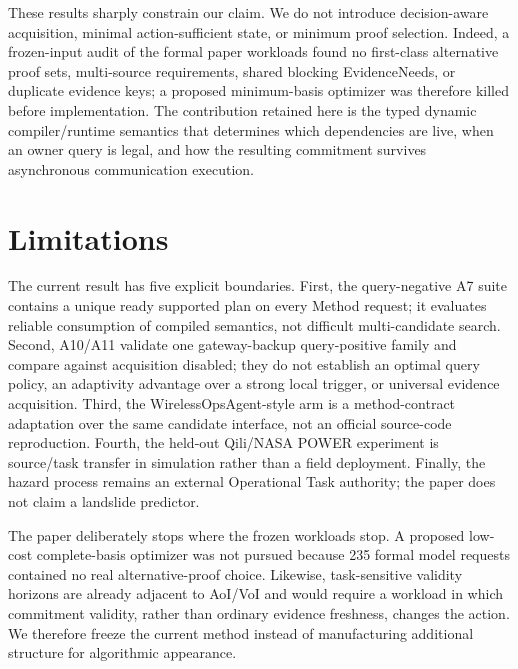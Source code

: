 \documentclass[journal,10pt]{IEEEtran}
\begin{document}
These results sharply constrain our claim. We do not introduce decision-aware acquisition,
minimal action-sufficient state, or minimum proof selection. Indeed, a frozen-input audit of the
formal paper workloads found no first-class alternative proof sets, multi-source requirements,
shared blocking EvidenceNeeds, or duplicate evidence keys; a proposed minimum-basis optimizer was
therefore killed before implementation. The contribution retained here is the typed dynamic
compiler/runtime semantics that determines which dependencies are live, when an owner query is
legal, and how the resulting commitment survives asynchronous communication execution.

\section{Limitations}
The current result has five explicit boundaries. First, the query-negative A7 suite contains a
unique ready supported plan on every Method request; it evaluates reliable consumption of compiled
semantics, not difficult multi-candidate search. Second, A10/A11 validate one gateway-backup
query-positive family and compare against acquisition disabled; they do not establish an optimal
query policy, an adaptivity advantage over a strong local trigger, or universal evidence
acquisition. Third, the WirelessOpsAgent-style arm is a method-contract adaptation over the same
candidate interface, not an official source-code reproduction. Fourth, the held-out Qili/NASA
POWER experiment is source/task transfer in simulation rather than a field deployment. Finally,
the hazard process remains an external Operational Task authority; the paper does not claim a
landslide predictor.

The paper deliberately stops where the frozen workloads stop. A proposed low-cost complete-basis
optimizer was not pursued because 235 formal model requests contained no real alternative-proof
choice. Likewise, task-sensitive validity horizons are already adjacent to AoI/VoI and would
require a workload in which commitment validity, rather than ordinary evidence freshness, changes
the action. We therefore freeze the current method instead of manufacturing additional structure
for algorithmic appearance.
\end{document}
